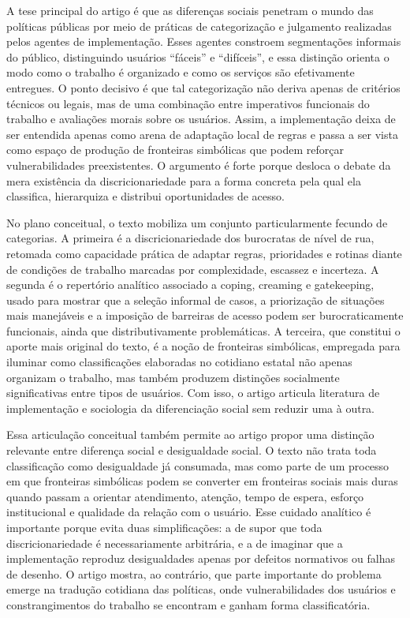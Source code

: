 \documentclass[12pt,a4paper]{article}
\begin{document}
A tese principal do artigo é que as diferenças sociais penetram o mundo das políticas públicas por meio de práticas de categorização e julgamento realizadas pelos agentes de implementação. Esses agentes constroem segmentações informais do público, distinguindo usuários “fáceis” e “difíceis”, e essa distinção orienta o modo como o trabalho é organizado e como os serviços são efetivamente entregues. O ponto decisivo é que tal categorização não deriva apenas de critérios técnicos ou legais, mas de uma combinação entre imperativos funcionais do trabalho e avaliações morais sobre os usuários. Assim, a implementação deixa de ser entendida apenas como arena de adaptação local de regras e passa a ser vista como espaço de produção de fronteiras simbólicas que podem reforçar vulnerabilidades preexistentes. O argumento é forte porque desloca o debate da mera existência da discricionariedade para a forma concreta pela qual ela classifica, hierarquiza e distribui oportunidades de acesso. \parencite{lotta2020_categorizando_usuarios}

No plano conceitual, o texto mobiliza um conjunto particularmente fecundo de categorias. A primeira é a discricionariedade dos burocratas de nível de rua, retomada como capacidade prática de adaptar regras, prioridades e rotinas diante de condições de trabalho marcadas por complexidade, escassez e incerteza. A segunda é o repertório analítico associado a coping, creaming e gatekeeping, usado para mostrar que a seleção informal de casos, a priorização de situações mais manejáveis e a imposição de barreiras de acesso podem ser burocraticamente funcionais, ainda que distributivamente problemáticas. A terceira, que constitui o aporte mais original do texto, é a noção de fronteiras simbólicas, empregada para iluminar como classificações elaboradas no cotidiano estatal não apenas organizam o trabalho, mas também produzem distinções socialmente significativas entre tipos de usuários. Com isso, o artigo articula literatura de implementação e sociologia da diferenciação social sem reduzir uma à outra. \parencite{lotta2020_categorizando_usuarios,lotta2019_teorias_analises}

Essa articulação conceitual também permite ao artigo propor uma distinção relevante entre diferença social e desigualdade social. O texto não trata toda classificação como desigualdade já consumada, mas como parte de um processo em que fronteiras simbólicas podem se converter em fronteiras sociais mais duras quando passam a orientar atendimento, atenção, tempo de espera, esforço institucional e qualidade da relação com o usuário. Esse cuidado analítico é importante porque evita duas simplificações: a de supor que toda discricionariedade é necessariamente arbitrária, e a de imaginar que a implementação reproduz desigualdades apenas por defeitos normativos ou falhas de desenho. O artigo mostra, ao contrário, que parte importante do problema emerge na tradução cotidiana das políticas, onde vulnerabilidades dos usuários e constrangimentos do trabalho se encontram e ganham forma classificatória. \parencite{lotta2020_categorizando_usuarios}
\end{document}
